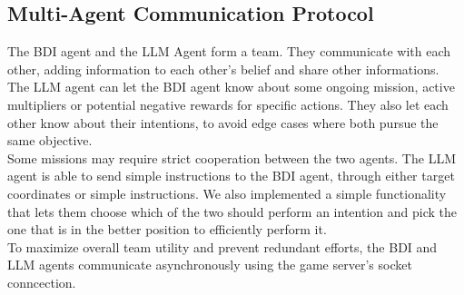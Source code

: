 \documentclass[11pt,a4paper]{article}
\begin{document}
\subsection{Multi-Agent Communication Protocol}
The BDI agent and the LLM Agent form a team. They communicate with each other, adding information to each other's belief and share other informations.
\\The LLM agent can let the BDI agent know about some ongoing mission, active multipliers or potential negative rewards for specific actions.
They also let each other know about their intentions, to avoid edge cases where both pursue the same objective. 
\\Some missions may require strict cooperation between the two agents. The LLM agent is able to send simple instructions to the BDI agent, through either target coordinates or simple instructions.
We also implemented a simple functionality that lets them choose which of the two should perform an intention and pick the one that is in the better position to efficiently perform it.
\\To maximize overall team utility and prevent redundant efforts, the BDI and LLM agents communicate asynchronously using the game server's socket conncection.
\end{document}
